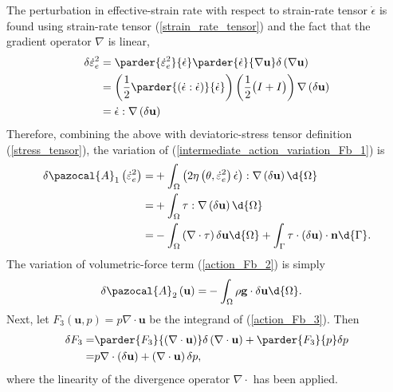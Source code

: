 The perturbation in effective-strain rate with respect to strain-rate tensor $\dot{\epsilon}$ is found using strain-rate tensor (\ref{strain_rate_tensor}) and the fact that the gradient operator $\nabla$ is linear,
\begin{align*}
  \delta \dot{\varepsilon}_e^2 &= \parder{\dot{\varepsilon}_e^2}{\dot{\epsilon}} \parder{\dot{\epsilon}}{\nabla \mathbf{u}} \delta \left( \nabla \mathbf{u} \right) \\
   &= \left( \frac{1}{2} \parder{ \left( \dot{\epsilon} : \dot{\epsilon} \right) }{\dot{\epsilon}} \right) \left( \frac{1}{2} \big( I + I \big) \right) \nabla \left( \delta \mathbf{u} \right) \\
   &= \dot{\epsilon} : \nabla \left( \delta \mathbf{u} \right)
\end{align*}
Therefore, combining the above with deviatoric-stress tensor definition (\ref{stress_tensor}), the variation of (\ref{intermediate_action_variation_Fb_1}) is
\begin{align}
  \delta \pazocal{A}_1 \left( \dot{\varepsilon}_e^2 \right) = &+ \int_{\Omega} \left( 2 \eta \left( \theta, \dot{\varepsilon}_e^2 \right) \dot{\epsilon} \right) : \nabla \left( \delta \mathbf{u} \right) \d{\Omega} \notag \\
  = &+ \int_{\Omega} \tau : \nabla \left( \delta \mathbf{u} \right) \d{\Omega} \notag \\
  \label{action_variation_Fb_1}
  = &- \int_{\Omega} \left( \nabla \cdot \tau \right) \delta \mathbf{u} \d{\Omega} + \int_{\Gamma} \tau \cdot \left( \delta \mathbf{u} \right) \cdot \mathbf{n} \d{\Gamma}.
\end{align}
The variation of volumetric-force term (\ref{action_Fb_2}) is simply
\begin{align}
  \label{action_variation_Fb_2}
  \delta \pazocal{A}_2 \left(\mathbf{u} \right) = &- \int_{\Omega} \rho \mathbf{g} \cdot \delta \mathbf{u} \d{\Omega}.
\end{align}
Next, let $F_3\left( \mathbf{u}, p \right) = p \nabla \cdot \mathbf{u}$ be the integrand of (\ref{action_Fb_3}).
Then
\begin{align*}
  \delta F_3 =& \parder{F_3}{\left( \nabla \cdot \mathbf{u} \right)} \delta \left( \nabla \cdot \mathbf{u} \right) + \parder{F_3}{p} \delta p \\ 
  =& p \nabla \cdot \left( \delta \mathbf{u} \right) + \left( \nabla \cdot \mathbf{u} \right) \delta p,
\end{align*}
where the linearity of the divergence operator $\nabla \cdot$ has been applied.

